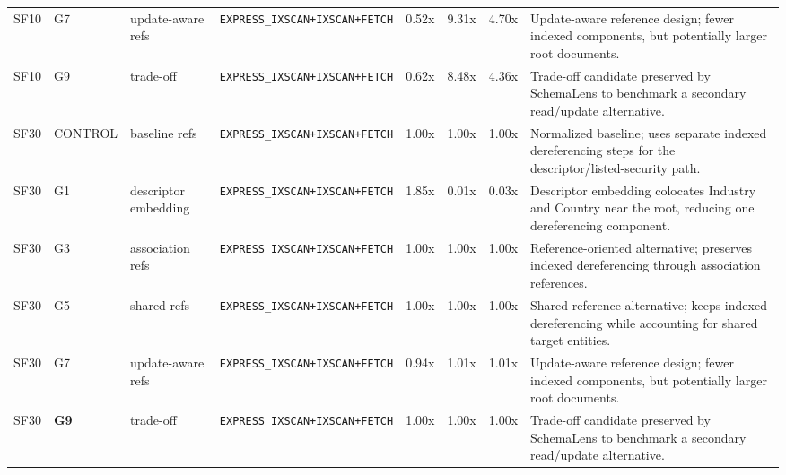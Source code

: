 \begin{table}[t]
\begin{tabular}{p{}p{}p{}p{}r r r p{}}
SF10 & G7 & update-aware refs & \texttt{EXPRESS\_IXSCAN+IXSCAN+FETCH} & 0.52x & 9.31x & 4.70x & Update-aware reference design; fewer indexed components, but potentially larger root documents. \tabularnewline
SF10 & G9 & trade-off & \texttt{EXPRESS\_IXSCAN+IXSCAN+FETCH} & 0.62x & 8.48x & 4.36x & Trade-off candidate preserved by SchemaLens to benchmark a secondary read/update alternative. \tabularnewline
\hline
SF30 & CONTROL & baseline refs & \texttt{EXPRESS\_IXSCAN+IXSCAN+FETCH} & 1.00x & 1.00x & 1.00x & Normalized baseline; uses separate indexed dereferencing steps for the descriptor/listed-security path. \tabularnewline
SF30 & G1 & descriptor embedding & \texttt{EXPRESS\_IXSCAN+IXSCAN+FETCH} & 1.85x & 0.01x & 0.03x & Descriptor embedding colocates Industry and Country near the root, reducing one dereferencing component. \tabularnewline
SF30 & G3 & association refs & \texttt{EXPRESS\_IXSCAN+IXSCAN+FETCH} & 1.00x & 1.00x & 1.00x & Reference-oriented alternative; preserves indexed dereferencing through association references. \tabularnewline
SF30 & G5 & shared refs & \texttt{EXPRESS\_IXSCAN+IXSCAN+FETCH} & 1.00x & 1.00x & 1.00x & Shared-reference alternative; keeps indexed dereferencing while accounting for shared target entities. \tabularnewline
SF30 & G7 & update-aware refs & \texttt{EXPRESS\_IXSCAN+IXSCAN+FETCH} & 0.94x & 1.01x & 1.01x & Update-aware reference design; fewer indexed components, but potentially larger root documents. \tabularnewline
SF30 & \textbf{G9} & trade-off & \texttt{EXPRESS\_IXSCAN+IXSCAN+FETCH} & 1.00x & 1.00x & 1.00x & Trade-off candidate preserved by SchemaLens to benchmark a secondary read/update alternative. \tabularnewline
\hline
\end{tabular}
\end{table}
